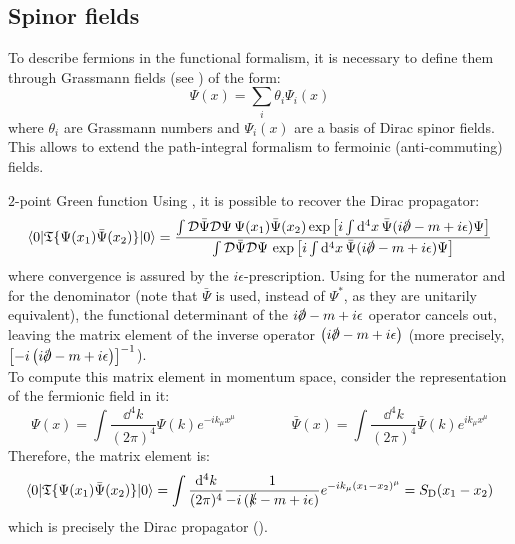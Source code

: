 \subsection{Spinor fields}

To describe fermions in the functional formalism, it is necessary to define them through Grassmann fields (see ) of the form:
\begin{equation*}
  \Psi(x) = \sum_i \theta_i \Psi_i(x)
\end{equation*}
where $ \theta_i $ are Grassmann numbers and $ \Psi_i(x) $ are a basis of Dirac spinor fields. This allows to extend the path-integral formalism to fermoinic (anti-commuting) fields.

\begin{example}{$ 2 $-point Green function}{}
  Using , it is possible to recover the Dirac propagator:
  \begin{equation*}
    \braket{0 | \tempord\{\Psi(x_1) \bar{\Psi}(x_2)\} | 0} = \frac{\int \mathcal{D} \bar{\Psi} \mathcal{D} \Psi\, \Psi(x_1) \bar{\Psi}(x_2) \exp \left[ i \int \dd^4x\, \bar{\Psi} ( i \slashed{\pa} - m + i\epsilon ) \Psi \right]}{\int \mathcal{D} \bar{\Psi} \mathcal{D} \Psi\, \exp \left[ i \int \dd^4x\, \bar{\Psi} ( i \slashed{\pa} - m + i\epsilon ) \Psi \right]}
  \end{equation*}
  where convergence is assured by the $ i\epsilon $-prescription. Using  for the numerator and  for the denominator (note that $ \bar{\Psi} $ is used, instead of $ \Psi^* $, as they are unitarily equivalent), the functional determinant of the $ i \slashed{\pa} - m + i\epsilon $ operator cancels out, leaving the matrix element of the inverse operator $ \left( i \slashed{\pa} - m + i\epsilon \right) $ (more precisely, $ \left[ -i \left( i \slashed{\pa} - m + i\epsilon \right) \right]^{-1} $). \\
  To compute this matrix element in momentum space, consider the representation of the fermionic field in it:
  \begin{equation}
    \Psi(x) = \int \frac{\dd^4k}{(2\pi)^4} \Psi(k) e^{-i k_\mu x^\mu}
    \qquad \qquad
    \bar{\Psi}(x) = \int \frac{\dd^4k}{(2\pi)^4} \bar{\Psi}(k) e^{i k_\mu x^\mu}
  \end{equation}
  Therefore, the matrix element is:
  \begin{equation*}
    \braket{0 | \mathfrak{T}\{\Psi(x_1) \bar{\Psi}(x_2)\} | 0} = \int \frac{\mathrm{d}^4k}{(2\pi)^4} \frac{1}{-i \left( \slashed{k} -m + i\epsilon \right)} e^{-i k_\mu (x_1 - x_2)^\mu} = S_\text{D}(x_1 - x_2)
  \end{equation*}
  which is precisely the Dirac propagator ().
\end{example}

